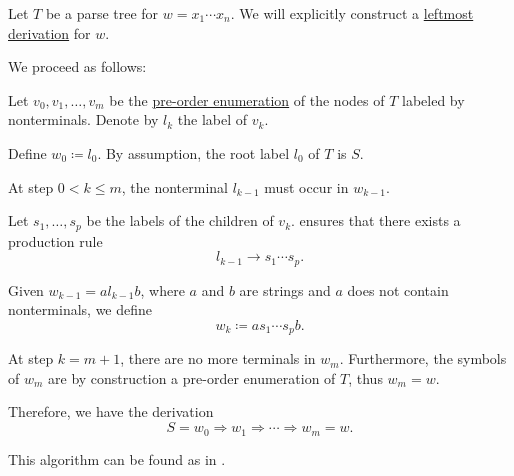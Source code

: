 \begin{algorithm}\label{alg:parse_tree_to_leftmost_derivation}
  Let \( T \) be a parse tree for \( w = x_1 \cdots x_n \). We will explicitly construct a \hyperref[def:leftmost_derivation]{leftmost derivation} for \( w \).

  We proceed as follows:
  \begin{thmenum}
     Let \( v_0, v_1, \ldots, v_m \) be the \hyperref[def:ordered_tree_enumeration]{pre-order enumeration} of the nodes of \( T \) labeled by nonterminals. Denote by \( l_k \) the label of \( v_k \).

    Define \( w_0 \coloneqq l_0 \). By assumption, the root label \( l_0 \) of \( T \) is \( S \).

     At step \( 0 < k \leq m \), the nonterminal \( l_{k-1} \) must occur in \( w_{k-1} \).

    Let \( s_1, \ldots, s_p \) be the labels of the children of \( v_k \).  ensures that there exists a production rule
    \begin{equation*}
      l_{k-1} \to s_1 \cdots s_p.
    \end{equation*}

    Given \( w_{k-1} = a l_{k-1} b \), where \( a \) and \( b \) are strings and \( a \) does not contain nonterminals, we define
    \begin{equation*}
      w_k \coloneqq a s_1 \cdots s_p b.
    \end{equation*}

     At step \( k = m + 1 \), there are no more terminals in \( w_m \). Furthermore, the symbols of \( w_m \) are by construction a pre-order enumeration of \( T \), thus \( w_m = w \).

    Therefore, we have the derivation
    \begin{equation*}
      S = w_0 \Rightarrow w_1 \Rightarrow \cdots \Rightarrow w_m = w.
    \end{equation*}
  \end{thmenum}
\end{algorithm}
\begin{comments}
  \item This algorithm can be found as  in \cite{code}.
\end{comments}

